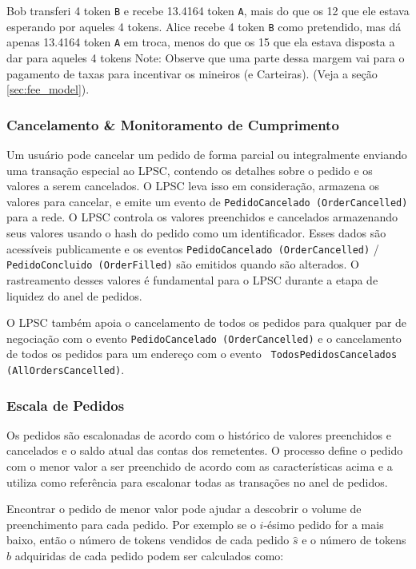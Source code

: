 \documentclass[UTF8,nofonts]{article}
\begin{document}
\begin{multicols}{2}
Bob transferi 4 token \verb|B| e recebe 13.4164 token \verb|A|,
mais do que os 12 que ele estava esperando por aqueles 4 tokens. Alice recebe 4 token \verb|B| como pretendido, mas dá apenas 13.4164 token \verb|A| em troca, menos do que os 15 que ela estava disposta a dar para aqueles 4 tokens
Note: Observe que uma parte dessa margem vai para o pagamento de taxas para incentivar os mineiros (e Carteiras). (Veja a seção \ref{sec:fee_model}).

\subsubsection{Cancelamento \& Monitoramento de Cumprimento}

Um usuário pode cancelar um pedido de forma parcial ou integralmente enviando uma transação especial ao LPSC, contendo os detalhes sobre o pedido e os valores a serem cancelados. O LPSC leva isso em consideração, armazena os valores para cancelar, e emite um evento de  \verb|PedidoCancelado (OrderCancelled)| para a rede. O LPSC controla os valores preenchidos e cancelados armazenando seus valores usando o hash do pedido como um identificador. Esses dados são acessíveis publicamente e os eventos \verb|PedidoCancelado (OrderCancelled)| / \verb|PedidoConcluido (OrderFilled)| são emitidos quando são alterados. O rastreamento desses valores é fundamental para o LPSC durante a etapa de liquidez do anel de pedidos.

O LPSC também apoia o cancelamento de todos os pedidos para qualquer par de negociação com o evento \verb|PedidoCancelado (OrderCancelled)| e o cancelamento de todos os pedidos para um endereço com o evento \verb| TodosPedidosCancelados (AllOrdersCancelled)|.


\subsubsection{Escala de Pedidos\label{sec:order_scaling}}
Os pedidos são escalonadas de acordo com o histórico de valores preenchidos e cancelados e o saldo atual das contas dos remetentes. O processo define o pedido com o menor valor a ser preenchido de acordo com as características acima e a utiliza como referência para escalonar todas as transações no anel de pedidos.

Encontrar o pedido de menor valor pode ajudar a descobrir o volume de preenchimento para cada pedido. Por exemplo se o  $i$-ésimo pedido for a mais baixo, então o número de tokens vendidos de cada pedido $\hat{s}$ e o número de tokens $\hat{b}$  adquiridas de cada pedido podem ser calculados como:



\end{multicols}
\end{document}
